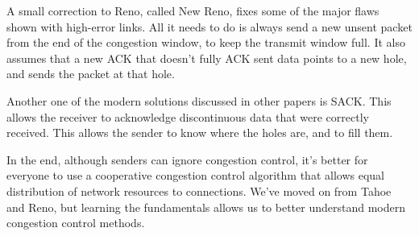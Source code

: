 \documentclass[fleqn,11pt]{article}
\begin{document}
A small correction to Reno, called New Reno, fixes some of the major flaws shown with high-error links.
All it needs to do is always send a new unsent packet from the end of the congestion window, to keep the transmit window full.
It also assumes that a new ACK that doesn't fully ACK sent data points to a new hole, and sends the packet at that hole.

Another one of the modern solutions discussed in other papers is SACK.
This allows the receiver to acknowledge discontinuous data that were correctly received.
This allows the sender to know where the holes are, and to fill them.

In the end, although senders can ignore congestion control, it's better for everyone to use a cooperative congestion control algorithm that allows equal distribution of network resources to connections.
We've moved on from Tahoe and Reno, but learning the fundamentals allows us to better understand modern congestion control methods.
\end{document}
